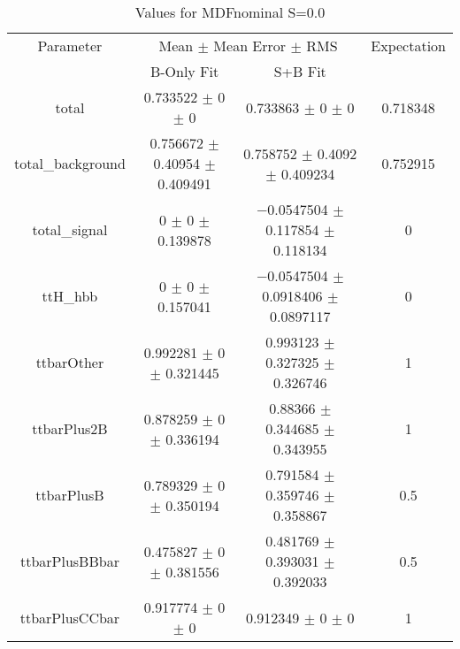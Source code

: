 \begin{table}
\centering
\caption{Values for MDFnominal S=0.0}
\begin{tabular}{cccc}
\toprule
Parameter & \multicolumn{2}{c}{Mean $\pm$ Mean Error $\pm$ RMS} & Expectation\\
 & B-Only Fit & S+B Fit & \\
\midrule
total & \num{0.733522} $\pm$ \num{0} $\pm$ \num{0} & \num{0.733863} $\pm$ \num{0} $\pm$ \num{0} & \num{0.718348}\\
total\_background & \num{0.756672} $\pm$ \num{0.40954} $\pm$ \num{0.409491} & \num{0.758752} $\pm$ \num{0.4092} $\pm$ \num{0.409234} & \num{0.752915}\\
total\_signal & \num{0} $\pm$ \num{0} $\pm$ \num{0.139878} & \num{-0.0547504} $\pm$ \num{0.117854} $\pm$ \num{0.118134} & \num{0}\\
ttH\_hbb & \num{0} $\pm$ \num{0} $\pm$ \num{0.157041} & \num{-0.0547504} $\pm$ \num{0.0918406} $\pm$ \num{0.0897117} & \num{0}\\
ttbarOther & \num{0.992281} $\pm$ \num{0} $\pm$ \num{0.321445} & \num{0.993123} $\pm$ \num{0.327325} $\pm$ \num{0.326746} & \num{1}\\
ttbarPlus2B & \num{0.878259} $\pm$ \num{0} $\pm$ \num{0.336194} & \num{0.88366} $\pm$ \num{0.344685} $\pm$ \num{0.343955} & \num{1}\\
ttbarPlusB & \num{0.789329} $\pm$ \num{0} $\pm$ \num{0.350194} & \num{0.791584} $\pm$ \num{0.359746} $\pm$ \num{0.358867} & \num{0.5}\\
ttbarPlusBBbar & \num{0.475827} $\pm$ \num{0} $\pm$ \num{0.381556} & \num{0.481769} $\pm$ \num{0.393031} $\pm$ \num{0.392033} & \num{0.5}\\
ttbarPlusCCbar & \num{0.917774} $\pm$ \num{0} $\pm$ \num{0} & \num{0.912349} $\pm$ \num{0} $\pm$ \num{0} & \num{1}\\
\bottomrule
\end{tabular}
\end{table}